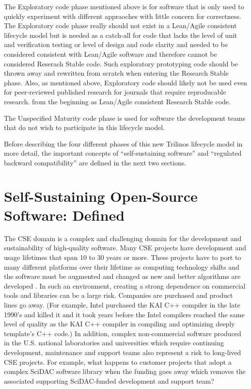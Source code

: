 \documentclass[11pt]{SANDreport}
\begin{document}
The Exploratory code phase mentioned above is for software that is
only used to quickly experiment with different appraoches with little
concern for correctness.  The Exploratory code phase really should not
exist in a Lean/Agile consistent lifecycle model but is needed as a
catch-all for code that lacks the level of unit and verification
testing or level of design and code clarity and needed to be
considered consistent with Lean/Agile software and therefore cannot be
considered Reserach Stable code.  Such exploratory prototyping code
should be thrown away and rewritten from scratch when entering the
Research Stable phase.  Also, as mentioned above, Exploratory code
should likely not be used even for peer-reviewed published research
for journals that require reproducable research.  from the beginning
as Lean/Agile consistent Research Stable code.

The Unspecified Maturity code phase is used for software the
development teams that do not wish to participate in this lifecycle
model.

Before describing the four different phases of this new Trilinos
lifecycle model in more detail, the important concepts of
``self-sustaining software'' and ``regulated backward compatibility''
are defined in the next two sections.


%
{}\section{Self-Sustaining Open-Source Software: Defined}
\label{sec:self_sustaining_open_source_software}
%

The CSE domain is a complex and challenging domain for the development
and sustainability of high-quality software.  Many CSE projects have
development and usage lifetimes that span 10 to 30 years or more.
These projects have to port to many different platforms over their
lifetime as computing technology shifts and the software must be
augmented and changed as new and better algorithms are developed
{}\cite{HPCNeedsAToolsStrategy05}.  In such an environment, creating a
strong dependence on commercial tools and libraries can be a large
risk.  Companies are purchased and product lines go away.  (For
example, Intel purchased the KAI C++ compiler in the late 1990's and
killed it and it took years before the Intel compilers reached the
same level of quality as the KAI C++ compiler in compiling and
optimizing deeply template's C++ code.)  In addition, complex
non-commercial software produced in the U.S. national laboratories and
universities which require continuing development, maintenance and
support teams also represent a risk to long-lived CSE projects.  For
example, what happens to customer projects that adopt a complex SciDAC
software library when the funding goes away which removes the
associated supporting SciDAC-funded development and support team?
\end{document}
